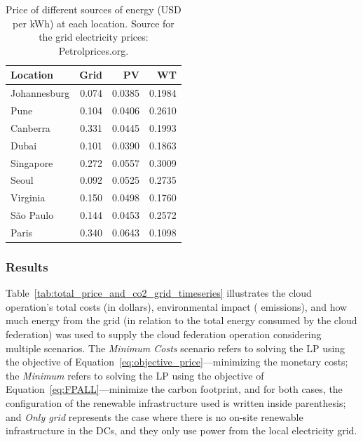 \begin{table}[h]
  
  \caption{Price of different sources of energy (USD per kWh) at each location. Source for the grid electricity prices: Petrolprices.org.  }\label{tab:price_electricity_sources} \centering
  
  \begin{tabular}{|l|r|r|r|}
  \hline    
  \textbf{Location} &   \textbf{Grid} & \textbf{PV} & \textbf{WT} \\
  \hline
  Johannesburg & 0.074 & 0.0385 &  0.1984   \\
  \hline
  Pune      &  0.104   & 0.0406 & 0.2610    \\
  \hline
  Canberra  & 0.331    &  0.0445 & 0.1993   \\
  \hline
  Dubai   & 0.101      & 0.0390 &   0.1863  \\
  \hline
  Singapore & 0.272    & 0.0557 & 0.3009    \\
  \hline     
  Seoul      & 0.092   & 0.0525 & 0.2735    \\
  \hline
  Virginia   & 0.150   &  0.0498 &  0.1760  \\
  \hline
  São Paulo  & 0.144   &  0.0453 & 0.2572   \\
  \hline 
  Paris      & 0.340   &  0.0643 & 0.1098   \\
  \hline  

\end{tabular}
\end{table}

\subsubsection{Results}

Table~\ref{tab:total_price_and_co2_grid_timeseries} illustrates the cloud operation's total costs (in dollars), environmental impact ( emissions), and how much energy from the grid (in relation to the total energy consumed by the cloud federation) was used to supply the cloud federation operation considering multiple scenarios. The \textit{Minimum Costs} scenario refers to solving the LP using the objective of Equation~\eqref{eq:objective_price}---minimizing the monetary costs; the \textit{Minimum } refers to solving the LP using the objective of Equation~\eqref{eq:FPALL}---minimize the carbon footprint, and for both cases, the configuration of the renewable infrastructure used is written inside parenthesis; and \textit{Only grid} represents the case where there is no on-site renewable infrastructure in the DCs, and they only use power from the local electricity grid.


